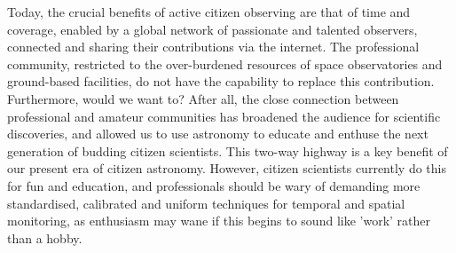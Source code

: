 \documentclass{ar2e}
\begin{document}
% 
% 
% 
% 


Today, the crucial benefits of active citizen observing are that of time and
coverage, enabled by a global network of passionate and talented observers,
connected and sharing their contributions via the internet.  The professional
community, restricted to the over-burdened resources of space observatories
and ground-based facilities, do not have the capability to replace this
contribution. Furthermore, would we want to?  After all, the close connection
between professional and amateur communities has broadened the audience for
scientific discoveries, and allowed us to use astronomy to educate and enthuse
the next generation of budding citizen scientists.  This two-way highway is a
key benefit of our present era of citizen astronomy.  However, citizen
scientists currently do this for fun and education, and professionals should
be wary of demanding more standardised, calibrated and uniform techniques for
temporal and spatial monitoring, as enthusiasm may wane if this begins to
sound like 'work' rather than a hobby.
\end{document}
